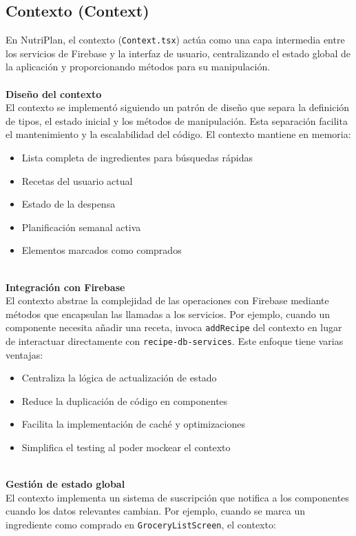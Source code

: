 \documentclass[twoside, openright, 11pt]{report}
\begin{document}
				
		\subsection{Contexto (Context)}
				En NutriPlan, el contexto (\texttt{Context.tsx}) actúa como una capa intermedia entre los servicios de Firebase y la interfaz de usuario, centralizando el estado global de la aplicación y proporcionando métodos para su manipulación.\\
				\textbf{\\Diseño del contexto}\\
				El contexto se implementó siguiendo un patrón de diseño que separa la definición de tipos, el estado inicial y los métodos de manipulación. Esta separación facilita el mantenimiento y la escalabilidad del código. El contexto mantiene en memoria:
				
				\begin{itemize}
					\item Lista completa de ingredientes para búsquedas rápidas
					\item Recetas del usuario actual
					\item Estado de la despensa
					\item Planificación semanal activa
					\item Elementos marcados como comprados
				\end{itemize}
				
				\textbf{\\Integración con Firebase}\\
				El contexto abstrae la complejidad de las operaciones con Firebase mediante métodos que encapsulan las llamadas a los servicios. Por ejemplo, cuando un componente necesita añadir una receta, invoca \texttt{addRecipe} del contexto en lugar de interactuar directamente con \texttt{recipe-db-services}. Este enfoque tiene varias ventajas:
				
				\begin{itemize}
					\item Centraliza la lógica de actualización de estado
					\item Reduce la duplicación de código en componentes
					\item Facilita la implementación de caché y optimizaciones
					\item Simplifica el testing al poder mockear el contexto
				\end{itemize}
				
				\textbf{\\Gestión de estado global}\\
				El contexto implementa un sistema de suscripción que notifica a los componentes cuando los datos relevantes cambian. Por ejemplo, cuando se marca un ingrediente como comprado en \texttt{GroceryListScreen}, el contexto:
				
\end{document}
